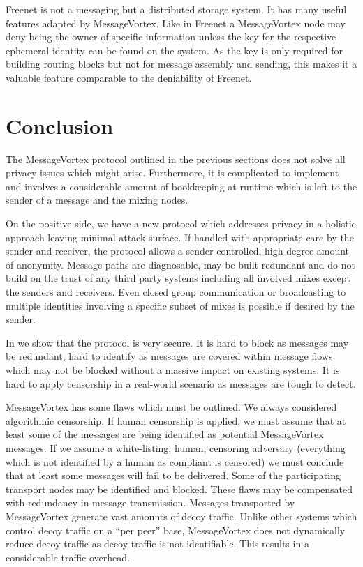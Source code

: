 \documentclass[runningheads]{llncs}
\begin{document}
Freenet is not a messaging but a distributed storage system. It has many useful features adapted by MessageVortex. Like in Freenet a MessageVortex node may deny being the owner of specific information unless the key for the respective ephemeral identity can be found on the system. As the key is only required for building routing blocks but not for message assembly and sending, this makes it a valuable feature comparable to the deniability of Freenet.

\section{Conclusion}
The MessageVortex protocol outlined in the previous sections does not solve all privacy issues which might arise. Furthermore, it is complicated to implement and involves a considerable amount of bookkeeping at runtime which is left to the sender of a message and the mixing nodes. 

On the positive side, we have a new protocol which addresses privacy in a holistic approach leaving minimal attack surface. If handled with appropriate care by the sender and receiver, the protocol allows a sender-controlled, high degree amount of anonymity. Message paths are diagnosable, may be built redundant and do not build on the trust of any third party systems including all involved mixes except the senders and receivers. Even closed group communication or broadcasting to multiple identities involving a specific subset of mixes is possible if desired by the sender.

In \cite{messageVortex} we show that the protocol is very secure. It is hard to block as messages may be redundant, hard to identify as messages are covered within message flows which may not be blocked without a massive impact on existing systems. It is hard to apply censorship in a real-world scenario as messages are tough to detect. 

MessageVortex has some flaws which must be outlined. We always considered algorithmic censorship. If human censorship is applied, we must assume that at least some of the messages are being identified as potential MessageVortex messages. If we assume a white-listing, human, censoring adversary (everything which is not identified by a human as compliant is censored) we must conclude that at least some messages will fail to be delivered.  Some of the participating transport nodes may be identified and blocked. These flaws may be compensated with redundancy in message transmission. Messages transported by MessageVortex generate vast amounts of decoy traffic. Unlike other systems which control decoy traffic on a ``per peer'' base, MessageVortex does not dynamically reduce decoy traffic as decoy traffic is not identifiable. This results in a considerable traffic overhead.
\end{document}
